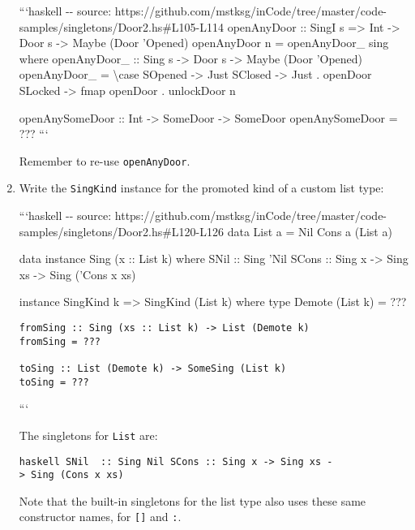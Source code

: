 \documentclass[]{article}
\begin{document}
\begin{enumerate}
  ```haskell -\/- source:
  https://github.com/mstksg/inCode/tree/master/code-samples/singletons/Door2.hs\#L105-L114
  openAnyDoor :: SingI s =\textgreater{} Int -\textgreater{} Door s
  -\textgreater{} Maybe (Door 'Opened) openAnyDoor n = openAnyDoor\_ sing where
  openAnyDoor\_ :: Sing s -\textgreater{} Door s -\textgreater{} Maybe (Door
  'Opened) openAnyDoor\_ = \textbackslash{}case SOpened -\textgreater{} Just
  SClosed -\textgreater{} Just . openDoor SLocked -\textgreater{} fmap openDoor
  . unlockDoor n

  openAnySomeDoor :: Int -\textgreater{} SomeDoor -\textgreater{} SomeDoor
  openAnySomeDoor = ??? ```

  Remember to re-use \texttt{openAnyDoor}.
\item
  Write the \texttt{SingKind} instance for the promoted kind of a custom list
  type:

  ```haskell -\/- source:
  https://github.com/mstksg/inCode/tree/master/code-samples/singletons/Door2.hs\#L120-L126
  data List a = Nil \textbar{} Cons a (List a)

  data instance Sing (x :: List k) where SNil :: Sing 'Nil SCons :: Sing x
  -\textgreater{} Sing xs -\textgreater{} Sing ('Cons x xs)

  instance SingKind k =\textgreater{} SingKind (List k) where type Demote (List
  k) = ???

\begin{verbatim}
fromSing :: Sing (xs :: List k) -> List (Demote k)
fromSing = ???

toSing :: List (Demote k) -> SomeSing (List k)
toSing = ???
\end{verbatim}

  ```

  The singletons for \texttt{List} are:

  \texttt{haskell\ SNil\ \ ::\ Sing\ \textquotesingle{}Nil\ SCons\ ::\ Sing\ x\ -\textgreater{}\ Sing\ xs\ -\textgreater{}\ Sing\ (\textquotesingle{}Cons\ x\ xs)}

  Note that the built-in singletons for the list type also uses these same
  constructor names, for \texttt{{[}{]}} and \texttt{:}.
\end{enumerate}
\end{document}
